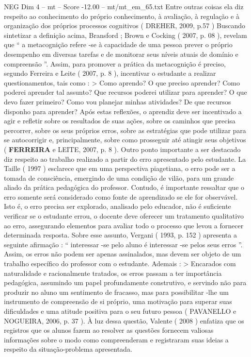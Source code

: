 \begin{textsample}{NEG Dim 4 – mt – Score -12.00 – mt/mt\_em\_65.txt}
Entre outras coisas ela diz respeito ao conhecimento do próprio conhecimento, à avaliação, à regulação e à organização dos próprios processos cognitivos ( DREHER, 2009, p.57 ) Buscando sintetizar a definição acima, Bransford ; Brown e Cocking ( 2007, p. 08 ), revelam que “ a metacognição refere -se à capacidade de uma pessoa prever o próprio desempenho em diversas tarefas e de monitorar seus níveis atuais de domínio e compreensão ”.
Assim, para promover a prática da metacognição é preciso, segundo Ferreira e Leite ( 2007, p. 8 ), incentivar o estudante a realizar questionamentos, tais como : > Como aprendo?
O que preciso aprender?
Como poderei aprender tal assunto?
Que recursos poderei utilizar para aprender?
O que devo fazer primeiro?
Como vou planejar minhas atividades?
De que recursos disponho para aprender?
Após estas reflexões, o aprendiz deve ser incentivado a agir e refletir sobre os resultados de suas ações, sobre os caminhos que precisa percorrer, sobre os seus próprios erros, sobre as estratégias que pode utilizar para se autocorrigir e, principalmente, sobre como prosseguir até atingir seus objetivos ( \textbf{FERREIRA} e LEITE, 2007, p. 8 ).
Outro ponto importante a ser destacado diz respeito ao trabalho realizado a partir do erro apresentado pelo estudante.
La Taille ( 1997 ) esclarece que em uma perspectiva piagetiana, o erro pode ser a tomada de consciência, emergindo de uma condição de vilão, para um grande aliado da prática pedagógica do professor.
Contudo, é importante ressaltar que o erro somente será considerado como fonte de aprendizado se ele for observável.
Isto é, o erro precisa ser explorado, analisado pelo educador, não é suficiente verificar se o estudante errou, o docente deve oferecer um tratamento qualitativo ao erro, assegurando elementos para avaliar todo o processo que levou a fornecer determinada resposta.
Sobre esse assunto, Vergani ( 1993, p. 152 ) apresenta a seguinte afirmação : “ interessar -se pelo aluno é interessar -se pelos seus erros ”.
Assim, os erros não podem ser apenas assinalados, mas devem ser objeto de um trabalho específico do professor com o estudante.
Ademais : > Encarados com naturalidade e racionalmente tratados, os erros passam a ter importância pedagógica, assumindo um papel profundamente construtivo, e servindo não para produzir no aluno um sentimento de fracasso, mas para possibilitar -lhe um instrumento de compreensão de si próprio, uma motivação para superar suas dificuldades e uma atitude positiva para o seu futuro pessoa ( PAVANELLO e NOGUEIRA, 2006, p. 37 ).
À luz dessa questão, Valente ( 2008 ) enfatiza que os registros que os alunos fazem ao resolver as questões fornecem valiosas informações sobre o modo como compreenderam e registraram suas ideias a respeito da situação-problema apresentada.

\end{textsample}
